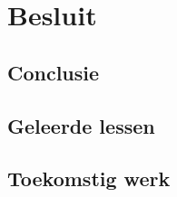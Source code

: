 \chapter{Besluit}
\label{chap:besluit}

\section{Conclusie} %

\section{Geleerde lessen}


\section{Toekomstig werk} %


